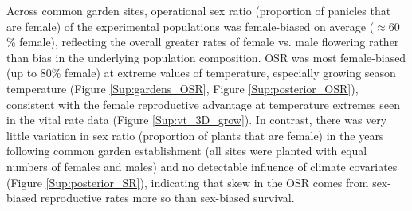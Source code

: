\documentclass[12pt]{article}\usepackage[]{graphicx}\usepackage[dvipsnames]{xcolor}
\begin{document}
Across common garden sites, operational sex ratio (proportion of panicles that are female) of the experimental populations was female-biased on average ($\approx 60$ \% female), reflecting the overall greater rates of female vs. male flowering rather than bias in the underlying population composition. 
OSR was most female-biased (up to 80\% female) at extreme values of temperature, especially growing season temperature (Figure \ref{Sup:gardens_OSR}, Figure \ref{Sup:posterior_OSR}), consistent with the female reproductive advantage at temperature extremes seen in the vital rate data (Figure \ref{Sup:vt_3D_grow}). 
In contrast, there was very little variation in sex ratio (proportion of plants that are female) in the years following common garden establishment (all sites were planted with equal numbers of females and males) and no detectable influence of climate covariates (Figure \ref{Sup:posterior_SR}), indicating that skew in the OSR comes from sex-biased reproductive rates more so than sex-biased survival. 
\end{document}
